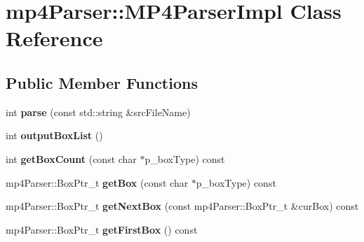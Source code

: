 \hypertarget{classmp4_parser_1_1_m_p4_parser_impl}{}\section{mp4\+Parser\+::M\+P4\+Parser\+Impl Class Reference}
\label{classmp4_parser_1_1_m_p4_parser_impl}
\subsection*{Public Member Functions}
\begin{DoxyCompactItemize}
\item 
\mbox{\label{classmp4_parser_1_1_m_p4_parser_impl_a9dc0fccb9f31f282cfe6433dcd732234}} 
int {\bfseries parse} (const std\+::string \&src\+File\+Name)
\item 
\mbox{\label{classmp4_parser_1_1_m_p4_parser_impl_a8e4ecdd02ac4c0296559799f9c96ec70}} 
int {\bfseries output\+Box\+List} ()
\item 
\mbox{\label{classmp4_parser_1_1_m_p4_parser_impl_a80b0f82a8f1ab9be1702791816b07a52}} 
int {\bfseries get\+Box\+Count} (const char $\ast$p\+\_\+box\+Type) const
\item 
\mbox{\label{classmp4_parser_1_1_m_p4_parser_impl_a476636b183880adcbc5acb4581c246b4}} 
mp4\+Parser\+::\+Box\+Ptr\+\_\+t {\bfseries get\+Box} (const char $\ast$p\+\_\+box\+Type) const
\item 
\mbox{\label{classmp4_parser_1_1_m_p4_parser_impl_a236e948d4a31ea27599acd3b8eeda908}} 
mp4\+Parser\+::\+Box\+Ptr\+\_\+t {\bfseries get\+Next\+Box} (const mp4\+Parser\+::\+Box\+Ptr\+\_\+t \&cur\+Box) const
\item 
\mbox{\label{classmp4_parser_1_1_m_p4_parser_impl_a9544cce06976fad9c53fb0025342c5e0}} 
mp4\+Parser\+::\+Box\+Ptr\+\_\+t {\bfseries get\+First\+Box} () const
\item 
\mbox{\label{classmp4_parser_1_1_m_p4_parser_impl_aeb890af1a7ed0bf864bb8a8601809c08}} 

\end{DoxyCompactItemize}
